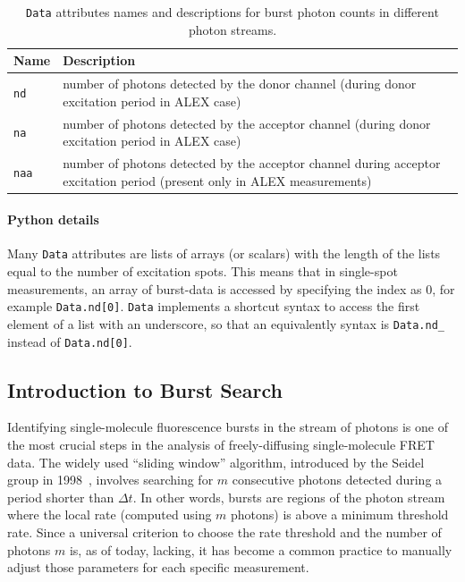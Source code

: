 \documentclass[10pt,letterpaper]{article}
\begin{document}
\begin{table}
\begin{tabular}{l p{}}
  Name  & Description \\
  \hline
  \verb|nd| & number of photons detected by the donor channel (during donor excitation period in ALEX case)\\
  \verb|na| & number of photons detected by the acceptor channel (during donor excitation period in ALEX case)\\
  \verb|naa| & number of photons detected by the acceptor channel during acceptor excitation period (present only in ALEX measurements)\\
\end{tabular}
\caption{\label{tab:data_n}\texttt{Data} attributes names and descriptions for burst photon counts in different photon streams.}
\end{table}


\paragraph{Python details}
Many \verb|Data| attributes are lists of arrays (or scalars) with the length of the lists
equal to the number of excitation spots. This means that in
single-spot measurements, an array of burst-data
is accessed by specifying the index as 0, for example \verb|Data.nd[0]|.
\verb|Data| implements a shortcut syntax to access the first element of a list
with an underscore, so that an equivalently syntax is
\verb|Data.nd_| instead of \verb|Data.nd[0]|.

\subsection{Introduction to Burst Search}
\label{sec:burstsearch_intro}

Identifying single-molecule fluorescence bursts in the stream of photons is
one of the most crucial steps in the analysis of freely-diffusing single-molecule FRET data.
The widely used ``sliding window'' algorithm, introduced by the Seidel group in 
1998~\cite{Eggeling_1998,Fries_1998}, involves searching for
$m$ consecutive photons detected during a period shorter than
$\Delta t$. In other words, bursts are regions of the photon stream where the
local rate (computed using $m$ photons) is above a minimum threshold rate.
Since a universal criterion to choose the rate threshold and
the number of photons $m$ is, as of today, lacking, it has become a common
practice to manually adjust those parameters for each specific measurement.
\end{document}
